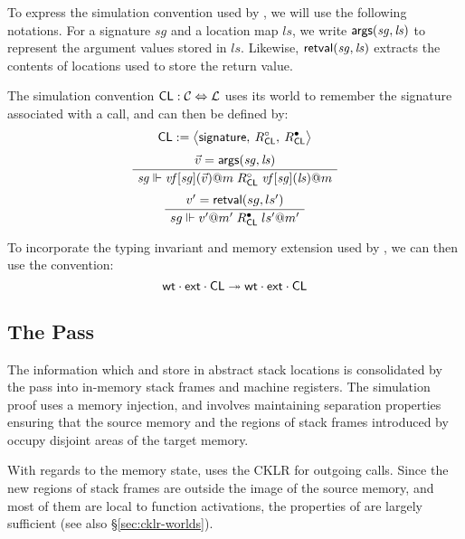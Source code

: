 \documentclass[sigplan,screen]{acmart}
\newenvironment{optional}{}{}
\begin{document}
\begin{optional}
To express the simulation convention used by ,
we will use the following notations.
For a signature $\mathit{sg}$ and a location map $\mathit{ls}$,
we write $ \mathsf{args} (\mathit{sg}, \mathit{ls})$
to represent the argument values stored in $\mathit{ls}$.
Likewise,
$ \mathsf{retval} (\mathit{sg}, \mathit{ls})$ extracts
the contents of locations used to store the return value.

The simulation convention
${  \mathsf{CL}  } : \mathcal{C} \Leftrightarrow \mathcal{L}$
uses its world to remember %
the signature associated with a call,
and can then be defined by:
\[
  {  \mathsf{CL}  } := \big\langle
       \mathsf{signature} , \:
      R_{  \mathsf{CL}  }^\circ, \:
      R_{  \mathsf{CL}  }^\bullet \big\rangle
\]
\[
  \AxiomC{$\vec{v} = \kw{args}(\mathit{sg}, \mathit{ls})$}
  \UnaryInfC{$
      \mathit{sg} \Vdash
      \mathit{vf}[\mathit{sg}](\vec{v})@m
      \mathrel{R_\cc{C}{L}^\que}
      \mathit{vf}[\mathit{sg}](\mathit{ls})@m$}
  \DisplayProof
\]
\[
  \AxiomC{$v' = \kw{retval}(sg, ls')$}
  \UnaryInfC{$
      sg \Vdash
      v'@m'
      \mathrel{R_\cc{C}{L}^\ans}
      ls'@m'$}
  \DisplayProof
\]

To incorporate the typing invariant and memory extension
used by ,
we can then use the convention:
\[
   \mathsf{wt}  \cdot  \mathsf{ext}  \cdot { \ensuremath{ \mathsf{CL} } }
  \twoheadrightarrow
   \mathsf{wt}  \cdot  \mathsf{ext}  \cdot { \ensuremath{ \mathsf{CL} } }
\]


\subsection{The  Pass} \label{sec:stacking} %

The information which
 and  store in abstract stack locations
is consolidated by the  pass
into in-memory stack frames and machine registers.
The simulation proof uses a memory injection,
and involves maintaining separation properties
ensuring that the source memory and
the regions of stack frames
introduced by 
occupy disjoint areas of the target memory.

With regards to the memory state,
 uses the CKLR 
for outgoing calls.
Since the new regions of stack frames
are outside the image of the source memory,
and most of them are local to
function activations,
the properties of 
are largely sufficient
(see also \S\ref{sec:cklr-worlds}).


\end{optional}
\end{document}
